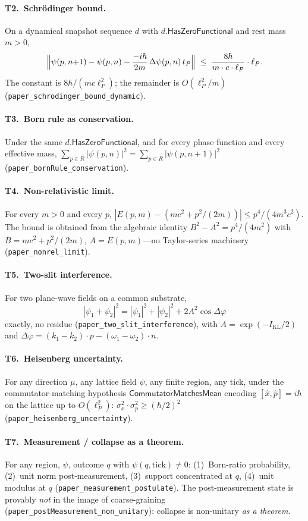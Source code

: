 \documentclass[aps,prl,twocolumn,superscriptaddress,nofootinbib,10pt]{revtex4-2}
\newcommand{\KL}{I_{\mathrm{KL}}}
\newcommand{\lP}{\ell_P}
\newcommand{\tP}{t_P}
\newcommand{\HasZF}{\mathsf{HasZeroFunctional}}
\newcommand{\CMM}{\mathsf{CommutatorMatchesMean}}
\begin{document}
\paragraph{T2.\ Schr\"odinger bound.}
On a dynamical snapshot sequence $d$ with $d.\HasZF$ and rest mass
$m>0$,
\[
\Bigl\|\psi(p,n{+}1)-\psi(p,n)
 -\frac{-i\hbar}{2m}\,\Delta\psi(p,n)\,\tP\Bigr\|
\;\le\; \frac{8\hbar}{m\cdot c\cdot\lP}\cdot\lP.
\]
The constant is $8\hbar/(mc\lP^{2})$; the remainder is $O(\lP^{2}/m)$
(\texttt{paper\_schrodinger\_bound\_dynamic}).

\paragraph{T3.\ Born rule as conservation.}
Under the same $d.\HasZF$, and for every phase function and every
effective mass,
$\sum_{p\in R}|\psi(p,n)|^{2}
 =\sum_{p\in R}|\psi(p,n{+}1)|^{2}$
(\texttt{paper\_bornRule\_conservation}).

\paragraph{T4.\ Non-relativistic limit.}
For every $m>0$ and every $p$,
$|E(p,m)-(mc^{2}+p^{2}/(2m))|\le p^{4}/(4m^{3}c^{2})$. The bound is
obtained from the algebraic identity $B^{2}-A^{2}=p^{4}/(4m^{2})$
with $B=mc^{2}+p^{2}/(2m)$, $A=E(p,m)$---no Taylor-series machinery
(\texttt{paper\_nonrel\_limit}).

\paragraph{T5.\ Two-slit interference.}
For two plane-wave fields on a common substrate,
\[
|\psi_{1}+\psi_{2}|^{2}
 = |\psi_{1}|^{2}+|\psi_{2}|^{2}+2A^{2}\cos\Delta\varphi
\]
exactly, no residue
(\texttt{paper\_two\_slit\_interference}), with
$A=\exp(-\KL/2)$ and $\Delta\varphi=(k_{1}-k_{2})\cdot p-(\omega_{1}-\omega_{2})\cdot n$.

\paragraph{T6.\ Heisenberg uncertainty.}
For any direction $\mu$, any lattice field $\psi$, any finite region,
any tick, under the commutator-matching hypothesis $\CMM$ encoding
$[\hat{x},\hat{p}]=i\hbar$ on the lattice up to $O(\lP^{2})$:
$\sigma_{x}^{2}\cdot\sigma_{p}^{2}\ge(\hbar/2)^{2}$
(\texttt{paper\_heisenberg\_uncertainty}).

\paragraph{T7.\ Measurement / collapse as a theorem.}
For any region, $\psi$, outcome $q$ with $\psi(q,\mathrm{tick})\ne 0$:
(1)~Born-ratio probability,
(2)~unit norm post-measurement,
(3)~support concentrated at $q$,
(4)~unit modulus at $q$
(\texttt{paper\_measurement\_postulate}). The post-measurement state
is provably \emph{not} in the image of coarse-graining
(\texttt{paper\_postMeasurement\_non\_unitary}): collapse is
non-unitary \emph{as a theorem}.
\end{document}

